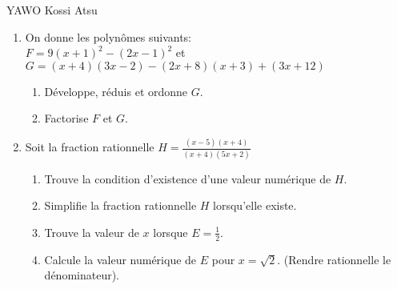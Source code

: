 \documentclass[12pt,a4paper]{book}
\newcommand{\prof}{YAWO Kossi Atsu}
\begin{document}
\begin{revision}{\prof}
\vspace{0.5cm}
\begin{exo}
\begin{enumerate}
\item On donne les polynômes suivants:\\
$F=9(x+1)^2-(2x-1)^2$ \qquad et \qquad $G=(x+4)(3x-2)-(2x+8)(x+3)+(3x+12)$
\begin{enumerate}
\item Développe, réduis et ordonne $G$.
\item Factorise $F$ et $G$.
\end{enumerate}
\item Soit la fraction rationnelle $H=\frac{(x-5)(x+4)}{(x+4)(5x+2)}$
\begin{enumerate}
\item Trouve la condition d'existence d'une valeur numérique de $H$.
\item Simplifie la fraction rationnelle $H$ lorsqu'elle existe.
\item Trouve la valeur de $x$ lorsque $E=\frac{1}{2}$.
\item Calcule la valeur numérique de $E$ pour $x=\sqrt{2}$. (Rendre rationnelle le dénominateur).
\end{enumerate}
\end{enumerate}
\end{exo}

\vspace{0.5cm}


\end{revision}
\end{document}
